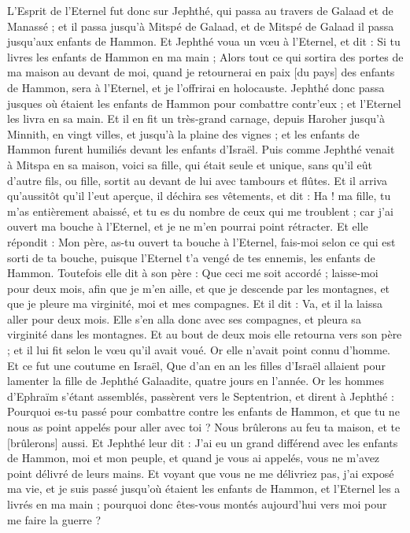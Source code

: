 \begin{multicols}{2}
L'Esprit de l'Eternel fut donc sur Jephthé, qui passa au travers de Galaad et de Manassé ; et il passa jusqu'à Mitspé de Galaad, et de Mitspé de Galaad il passa jusqu'aux enfants de Hammon.
Et Jephthé voua un vœu à l'Eternel, et dit : Si tu livres les enfants de Hammon en ma main ;
Alors tout ce qui sortira des portes de ma maison au devant de moi, quand je retournerai en paix [du pays] des enfants de Hammon, sera à l'Eternel, et je l'offrirai en holocauste.
Jephthé donc passa jusques où étaient les enfants de Hammon pour combattre contr'eux ; et l'Eternel les livra en sa main.
Et il en fit un très-grand carnage, depuis Haroher jusqu'à Minnith, en vingt villes, et jusqu'à la plaine des vignes ; et les enfants de Hammon furent humiliés devant les enfants d'Israël.
Puis comme Jephthé venait à Mitspa en sa maison, voici sa fille, qui était seule et unique, sans qu'il eût d'autre fils, ou fille, sortit au devant de lui avec tambours et flûtes.
Et il arriva qu'aussitôt qu'il l'eut aperçue, il déchira ses vêtements, et dit : Ha ! ma fille, tu m'as entièrement abaissé, et tu es du nombre de ceux qui me troublent ; car j'ai ouvert ma bouche à l'Eternel, et je ne m'en pourrai point rétracter.
Et elle répondit : Mon père, as-tu ouvert ta bouche à l'Eternel, fais-moi selon ce qui est sorti de ta bouche, puisque l'Eternel t'a vengé de tes ennemis, les enfants de Hammon.
Toutefois elle dit à son père : Que ceci me soit accordé ; laisse-moi pour deux mois, afin que je m'en aille, et que je descende par les montagnes, et que je pleure ma virginité, moi et mes compagnes.
Et il dit : Va, et il la laissa aller pour deux mois. Elle s'en alla donc avec ses compagnes, et pleura sa virginité dans les montagnes.
Et au bout de deux mois elle retourna vers son père ; et il lui fit selon le vœu qu'il avait voué. Or elle n'avait point connu d'homme. Et ce fut une coutume en Israël,
Que d'an en an les filles d'Israël allaient pour lamenter la fille de Jephthé Galaadite, quatre jours en l'année.
\VerseOne{}Or les hommes d'Ephraïm s'étant assemblés, passèrent vers le Septentrion, et dirent à Jephthé : Pourquoi es-tu passé pour combattre contre les enfants de Hammon, et que tu ne nous as point appelés pour aller avec toi ? Nous brûlerons au feu ta maison, et te [brûlerons] aussi.
Et Jephthé leur dit : J'ai eu un grand différend avec les enfants de Hammon, moi et mon peuple, et quand je vous ai appelés, vous ne m'avez point délivré de leurs mains.
Et voyant que vous ne me délivriez pas, j'ai exposé ma vie, et je suis passé jusqu'où étaient les enfants de Hammon, et l'Eternel les a livrés en ma main ; pourquoi donc êtes-vous montés aujourd'hui vers moi pour me faire la guerre ?

\end{multicols}
